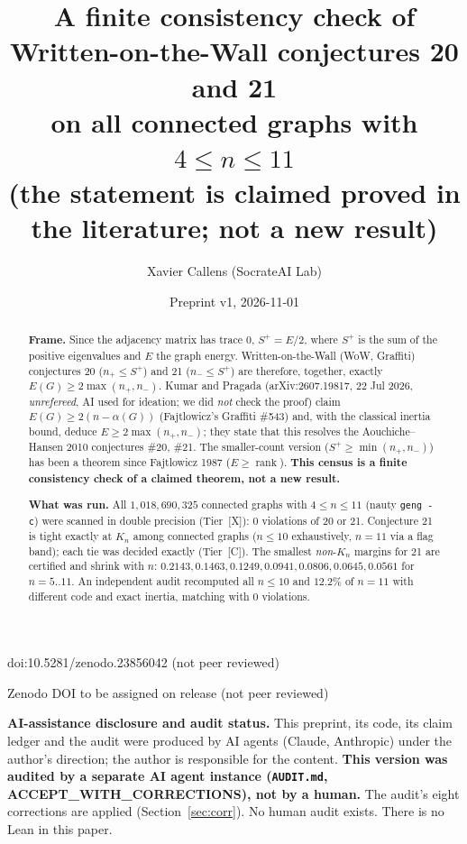 \documentclass[10pt]{article}
\title{A finite consistency check of Written-on-the-Wall conjectures 20 and 21\\
on all connected graphs with $4\le n\le 11$\\
{\large (the statement is claimed proved in the literature; not a new result)}}
\author{Xavier Callens (SocrateAI Lab)}
\date{Preprint v1, 2026-11-01}
\newcommand{\tier}[1]{\textsf{[#1]}}
\newcommand{\tC}{\tier{C}}
\newcommand{\tX}{\tier{X}}
\begin{document}
\maketitle
\begin{center}\small doi:10.5281/zenodo.23856042 \quad (not peer reviewed)\end{center}

\begin{center}\small Zenodo DOI to be assigned on release \quad (not peer reviewed)\end{center}

\noindent\textbf{AI-assistance disclosure and audit status.} This preprint, its code, its claim ledger and the audit were produced by AI agents (Claude, Anthropic) under the author's direction; the author is responsible for the content.
\textbf{This version was audited by a separate AI agent instance (\texttt{AUDIT.md}, ACCEPT\_WITH\_CORRECTIONS), not by a human.} The audit's eight corrections are applied (Section~\ref{sec:corr}). No human audit exists. There is no Lean in this paper.

\begin{abstract}
\noindent\textbf{Frame.} Since the adjacency matrix has trace $0$, $S^+=E/2$, where $S^+$ is the sum of the positive eigenvalues and $E$ the graph energy. Written-on-the-Wall (WoW, Graffiti) conjectures 20 ($n_+\le S^+$) and 21 ($n_-\le S^+$) are therefore, together, exactly $E(G)\ge 2\max(n_+,n_-)$. Kumar and Pragada (arXiv:2607.19817, 22 Jul 2026, \emph{unrefereed}, AI used for ideation; we did \emph{not} check the proof) claim $E(G)\ge 2(n-\alpha(G))$ (Fajtlowicz's Graffiti \#543) and, with the classical inertia bound, deduce $E\ge2\max(n_+,n_-)$; they state that this resolves the Aouchiche--Hansen 2010 conjectures \#20, \#21. The smaller-count version ($S^+\ge\min(n_+,n_-)$) has been a theorem since Fajtlowicz 1987 ($E\ge\operatorname{rank}$). \textbf{This census is a finite consistency check of a claimed theorem, not a new result.}

\noindent\textbf{What was run.} All $1{,}018{,}690{,}325$ connected graphs with $4\le n\le 11$ (nauty \texttt{geng -c}) were scanned in double precision (Tier~\tX{}): $0$ violations of 20 or 21. Conjecture 21 is tight exactly at $K_n$ among connected graphs ($n\le10$ exhaustively, $n=11$ via a flag band); each tie was decided exactly (Tier~\tC{}). The smallest \emph{non}-$K_n$ margins for 21 are certified and shrink with $n$: $0.2143,0.1463,0.1249,0.0941,0.0806,0.0645,0.0561$ for $n=5..11$. An independent audit recomputed all $n\le10$ and $12.2\%$ of $n=11$ with different code and exact inertia, matching with $0$ violations.
\end{abstract}
\end{document}
